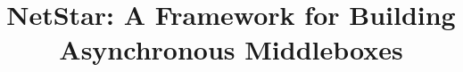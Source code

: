 \documentclass[preprint]{sigplanconf-eurosys}
\begin{document}

\iffalse
\conferenceinfo{CONF 'yy}{Month d--d, 20yy, City, ST, Country}
\copyrightyear{20yy}
\copyrightdata{978-1-nnnn-nnnn-n/yy/mm}
\copyrightdoi{nnnnnnn.nnnnnnn}
\fi


\titlebanner{}        %
\preprintfooter{}   %

\title{NetStar: A Framework for Building Asynchronous Middleboxes}



\maketitle



\begin{abstract}

\end{abstract}



\newpage



\end{document}
